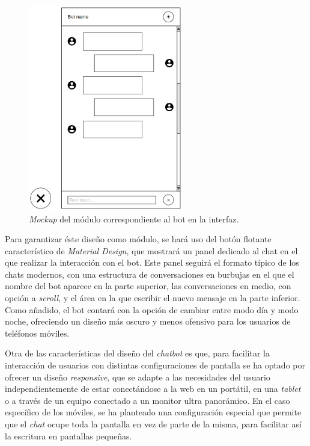 \documentclass[11pt,spanish,listoffigures]{tfgetsinf}
\begin{document}
\begin{figure}[h!]
    \centering
    \includegraphics[width=0.6\textwidth]{images/img07.png}
    \caption{\textit{Mockup} del módulo correspondiente al bot en la interfaz.}
    \label{fig:mockup}
\end{figure}

Para garantizar éste diseño como módulo, se hará uso del botón flotante característico de \textit{Material Design}, que mostrará un panel dedicado al chat en el que realizar la interacción con el bot. Este panel seguirá el formato típico de los chats modernos, con una estructura de conversaciones en burbujas en el que el nombre del bot aparece en la parte superior, las conversaciones en medio, con opción a \textit{scroll}, y el área en la que escribir el nuevo mensaje en la parte inferior. Como añadido, el bot contará con la opción de cambiar entre modo día y modo noche, ofreciendo un diseño más oscuro y menos ofensivo para los usuarios de teléfonos móviles.

Otra de las características del diseño del \textit{chatbot} es que, para facilitar la interacción de usuarios con distintas configuraciones de pantalla se ha optado por ofrecer un diseño \textit{responsive}, que se adapte a las necesidades del usuario independientemente de estar conectándose a la web en un portátil, en una \textit{tablet} o a través de un equipo conectado a un monitor ultra panorámico. En el caso específico de los móviles, se ha planteado una configuración especial que permite que el \textit{chat} ocupe toda la pantalla en vez de parte de la misma, para facilitar así la escritura en pantallas pequeñas.
\end{document}
